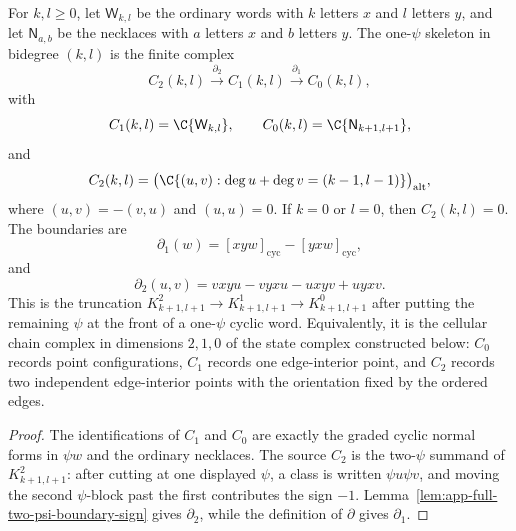 \begin{constr}
\label{constr:app-one-psi-three-term-skeleton}
  For \(k,l\geq0\), let \(\mathsf W_{k,l}\) be the ordinary words with
  \(k\) letters \(x\) and \(l\) letters \(y\), and let
  \(\mathsf N_{a,b}\) be the necklaces with \(a\) letters \(x\) and
  \(b\) letters \(y\).  The one-\(\psi\) skeleton in bidegree \((k,l)\) is
  the finite complex
  \[
    C_2(k,l)\xrightarrow{\partial_2}C_1(k,l)
      \xrightarrow{\partial_1}C_0(k,l),
  \]
  with
  \[
    C_1(k,l)=\C\{\mathsf W_{k,l}\},\qquad
    C_0(k,l)=\C\{\mathsf N_{k+1,l+1}\},
  \]
  and
  \[
    C_2(k,l)=
    \bigl(\C\{(u,v):\deg u+\deg v=(k-1,l-1)\}\bigr)_{\mathrm{alt}},
  \]
  where \((u,v)=-(v,u)\) and \((u,u)=0\).  If \(k=0\) or \(l=0\), then
  \(C_2(k,l)=0\).  The boundaries are
  \[
    \partial_1(w)=[xyw]_{\mathrm{cyc}}-[yxw]_{\mathrm{cyc}},
  \]
  and
  \[
    \partial_2(u,v)=vxyu-vyxu-uxyv+uyxv.
  \]
  This is the truncation
  \(K^2_{k+1,l+1}\to K^1_{k+1,l+1}\to K^0_{k+1,l+1}\) after putting the
  remaining \(\psi\) at the front of a one-\(\psi\) cyclic word.
  Equivalently, it is the cellular chain complex in dimensions
  \(2,1,0\) of the state complex constructed below: \(C_0\) records point
  configurations, \(C_1\) records one edge-interior point, and \(C_2\) records two
  independent edge-interior points with the orientation fixed by the ordered
  edges.
\end{constr}

\begin{proof}
  The identifications of \(C_1\) and \(C_0\) are exactly the graded cyclic
  normal forms in \(\psi w\) and the ordinary necklaces.  The source
  \(C_2\) is the two-\(\psi\) summand of \(K^2_{k+1,l+1}\): after cutting
  at one displayed \(\psi\), a class is written \(\psi u\psi v\), and
  moving the second \(\psi\)-block past the first contributes the sign
  \(-1\).  Lemma~\ref{lem:app-full-two-psi-boundary-sign} gives
  \(\partial_2\), while the definition of \(\partial\) gives
  \(\partial_1\).
\end{proof}

